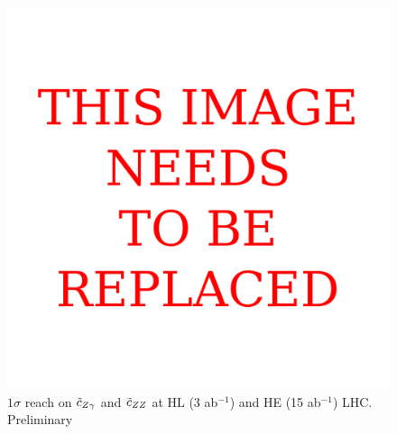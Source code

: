 \begin{figure}
\centering
 \includegraphics[scale=1.2]{section2/plots/tCza-tCzz-HL3ab-HE15ab}
\caption{$1\sigma$  reach on $\tilde c_{Z\gamma}$ and 
$\tilde c_{ZZ}$ at HL (3 ab$^{-1}$) and HE (15 ab$^{-1}$) LHC. {\cred Preliminary} }\label{fig:fit2p}
\end{figure}



